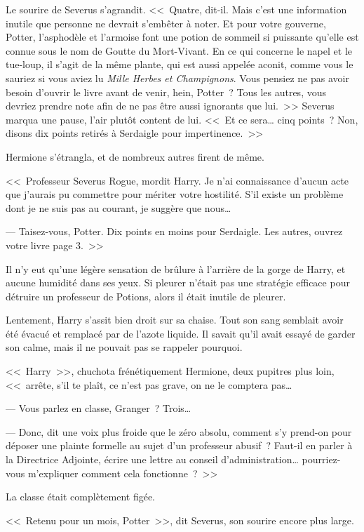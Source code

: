 Le sourire de Severus s'agrandit. <<~Quatre, dit-il. Mais c'est une information inutile que personne ne devrait s'embêter à noter. Et pour votre gouverne, Potter, l'asphodèle et l'armoise font une potion de sommeil si puissante qu'elle est connue sous le nom de Goutte du Mort-Vivant. En ce qui concerne le napel et le tue-loup, il s'agit de la même plante, qui est aussi appelée aconit, comme vous le sauriez si vous aviez lu \emph{Mille Herbes et Champignons}. Vous pensiez ne pas avoir besoin d'ouvrir le livre avant de venir, hein, Potter~? Tous les autres, vous devriez prendre note afin de ne pas être aussi ignorants que lui.~>> Severus marqua une pause, l'air plutôt content de lui. <<~Et ce sera… cinq points~? Non, disons dix points retirés à Serdaigle pour impertinence.~>>

Hermione s'étrangla, et de nombreux autres firent de même.

<<~Professeur Severus Rogue, mordit Harry. Je n'ai connaissance d'aucun acte que j'aurais pu commettre pour mériter votre hostilité. S'il existe un problème dont je ne suis pas au courant, je suggère que nous…

--- Taisez-vous, Potter. Dix points en moins pour Serdaigle. Les autres, ouvrez votre livre page 3.~>>

Il n'y eut qu'une légère sensation de brûlure à l'arrière de la gorge de Harry, et aucune humidité dans ses yeux. Si pleurer n'était pas une stratégie efficace pour détruire un professeur de Potions, alors il était inutile de pleurer.

Lentement, Harry s'assit bien droit sur sa chaise. Tout son sang semblait avoir été évacué et remplacé par de l'azote liquide. Il savait qu'il avait essayé de garder son calme, mais il ne pouvait pas se rappeler pourquoi.

<<~Harry~>>, chuchota frénétiquement Hermione, deux pupitres plus loin, <<~arrête, s'il te plaît, ce n'est pas grave, on ne le comptera pas…

--- Vous parlez en classe, Granger~? Trois…

--- Donc, dit une voix plus froide que le zéro absolu, comment s'y prend-on pour déposer une plainte formelle au sujet d'un professeur abusif~? Faut-il en parler à la Directrice Adjointe, écrire une lettre au conseil d'administration… pourriez-vous m'expliquer comment cela fonctionne~?~>>

La classe était complètement figée.

<<~Retenu pour un mois, Potter~>>, dit Severus, son sourire encore plus large.

